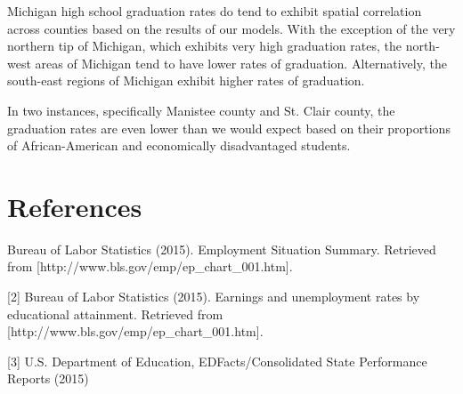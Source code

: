 \documentclass[12pt,letterpaper]{article}
\begin{document}
Michigan high school graduation rates do tend to exhibit spatial correlation across counties based on the results of our models. With the exception of the very northern tip of Michigan, which exhibits very high graduation rates, the north-west areas of Michigan tend to have lower rates of graduation. Alternatively, the south-east regions of Michigan exhibit higher rates of graduation.

In two instances, specifically Manistee county and St. Clair county, the graduation rates are even lower than we would expect based on their proportions of African-American and economically disadvantaged students.


\section{References}

\indent [1] Bureau of Labor Statistics  (2015). Employment Situation Summary. Retrieved from [http://www.bls.gov/emp/ep\_chart\_001.htm].

[2] Bureau of Labor Statistics  (2015). Earnings and unemployment rates by educational attainment. Retrieved from [http://www.bls.gov/emp/ep\_chart\_001.htm].

[3] U.S. Department of Education, EDFacts/Consolidated State Performance Reports (2015)
\end{document}
